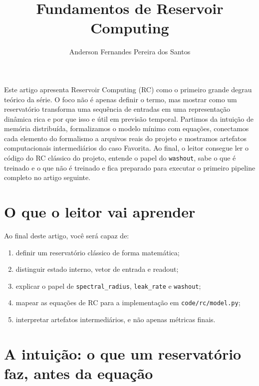 \documentclass[12pt]{article}
\title{Fundamentos de Reservoir Computing}
\author{Anderson Fernandes Pereira dos Santos}
\providecommand{\tightlist}{%
              \setlength{\itemsep}{0pt}\setlength{\parskip}{0pt}}
\begin{document}
            \maketitle

            \begin{resumo}
            Este artigo apresenta Reservoir Computing (RC) como o primeiro grande degrau teórico da série. O foco não é apenas definir o termo, mas mostrar como um reservatório transforma uma sequência de entradas em uma representação dinâmica rica e por que isso e útil em previsão temporal. Partimos da intuição de memória distribuída, formalizamos o modelo mínimo com equações, conectamos cada elemento do formalismo a arquivos reais do projeto e mostramos artefatos computacionais intermediários do caso Favorita. Ao final, o leitor consegue ler o código do RC clássico do projeto, entende o papel do \texttt{washout}, sabe o que é treinado e o que não é treinado e fica preparado para executar o primeiro pipeline completo no artigo seguinte.
            \end{resumo}

            \section{O que o leitor vai aprender}\label{1-o-que-o-leitor-vai-aprender}

Ao final deste artigo, você será capaz de:

\begin{enumerate}
\def\labelenumi{\arabic{enumi}.}
\tightlist
\item
  definir um reservatório clássico de forma matemática;
\item
  distinguir estado interno, vetor de entrada e readout;
\item
  explicar o papel de \texttt{spectral\_radius}, \texttt{leak\_rate} e \texttt{washout};
\item
  mapear as equações de RC para a implementação em \texttt{code/rc/model.py};
\item
  interpretar artefatos intermediários, e não apenas métricas finais.
\end{enumerate}

\section{A intuição: o que um reservatório faz, antes da equação}\label{2-a-intuiuxe7uxe3o-o-que-um-reservatuxf3rio-faz-antes-da-equauxe7uxe3o}
\end{document}
